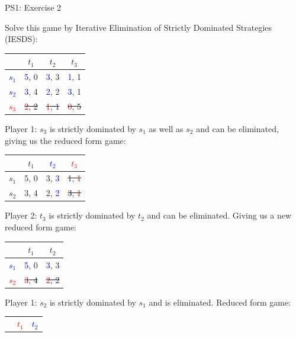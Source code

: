 \begin{frame}{PS1: Exercise 2}
\begin{multicols}{2}
  Solve this game by Iterative Elimination of Strictly Dominated Strategies (IESDS):
  \begin{table}
    \begin{tabular}{c|c|c|c}
            & $t_1$ & $t_2$ & $t_3$ \\
      \midrule
      \textcolor{blue}{$s_1$} & \textcolor{blue}{5}, 0  & \textcolor{blue}{3}, 3  & \textcolor{blue}{1}, 1 \\
      \midrule
      \textcolor{blue}{$s_2$} & \textcolor{blue}{3}, 4  & \textcolor{blue}{2}, 2  & \textcolor{blue}{3}, 1 \\
      \midrule
      \sout{\textcolor{red}{$s_3$}} & \sout{\textcolor{red}{2}, 2}  & \sout{\textcolor{red}{1}, 1}  & \sout{\textcolor{red}{0}, 5}
    \end{tabular}
  \end{table}
  Player 1: $s_3$ is strictly dominated by $s_1$ as well as $s_2$ and can be eliminated, giving us the reduced form game:
  \begin{table}
    \begin{tabular}{c|c|c|c}
            & $t_1$ & \textcolor{blue}{$t_2$} & \sout{\textcolor{red}{$t_3$}} \\
      \midrule
      $s_1$ & 5, 0  & 3, \textcolor{blue}{3}  & \sout{1, \textcolor{red}{1}} \\
      \midrule
      $s_2$ & 3, 4  & 2, \textcolor{blue}{2}  & \sout{3, \textcolor{red}{1}}
    \end{tabular}
  \end{table}
  Player 2: $t_3$ is strictly dominated by $t_2$ and can be eliminated.
\vfill\null \columnbreak
Giving us a new reduced form game:
\begin{table}
  \begin{tabular}{c|c|c}
          & $t_1$ & $t_2$ \\
    \midrule
    \textcolor{blue}{$s_1$} & \textcolor{blue}{5}, 0  & \textcolor{blue}{3}, 3  \\
    \midrule
    \sout{\textcolor{red}{$s_2$}} & \sout{\textcolor{red}{3}, 4}  & \sout{\textcolor{red}{2}, 2}
  \end{tabular}
\end{table}
Player 1: $s_2$ is strictly dominated by $s_1$ and is eliminated. Reduced form game:
\begin{table}
  \begin{tabular}{c|c|c}
          & \textcolor{red}{$t_1$} & \textcolor{blue}{$t_2$} \\

\end{tabular}
\end{table}
\end{multicols}
\end{frame}
